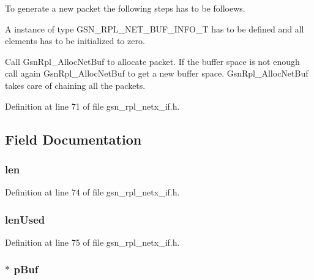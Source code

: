 To generate a new packet the following steps has to be folloews.
\begin{DoxyItemize}
\item A instance of type GSN\_\-RPL\_\-NET\_\-BUF\_\-INFO\_\-T has to be defined and all elements has to be initialized to zero.
\item Call GsnRpl\_\-AllocNetBuf to allocate packet. If the buffer space is not enough call again GsnRpl\_\-AllocNetBuf to get a new buffer space. GsnRpl\_\-AllocNetBuf takes care of chaining all the packets. 
\end{DoxyItemize}

Definition at line 71 of file gsn\_\-rpl\_\-netx\_\-if.h.



\subsection{Field Documentation}
\hypertarget{a00207_ab3bcead9c261261394a5d9b3bf8f95cb}{
\subsubsection[{len}]{ {\bf len}}}
\label{a00207_ab3bcead9c261261394a5d9b3bf8f95cb}


Definition at line 74 of file gsn\_\-rpl\_\-netx\_\-if.h.

\hypertarget{a00207_a30d3105211b3a23fe982def9305f4c40}{
\subsubsection[{lenUsed}]{ {\bf lenUsed}}}
\label{a00207_a30d3105211b3a23fe982def9305f4c40}


Definition at line 75 of file gsn\_\-rpl\_\-netx\_\-if.h.

\hypertarget{a00207_a9d6f28faefcf4436d36ac3e698e1ce50}{
\subsubsection[{pBuf}]{$\ast$ {\bf pBuf}}}
\label{a00207_a9d6f28faefcf4436d36ac3e698e1ce50}


